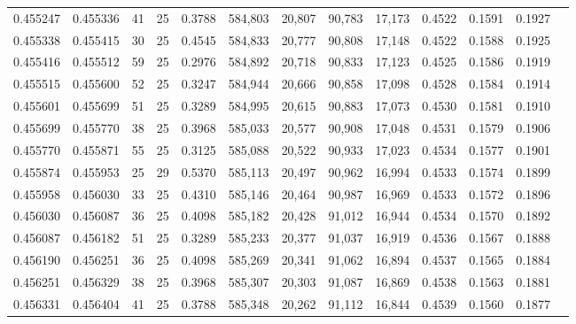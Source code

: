\begin{tabular}{rrrrrrrrrrrrr}
0.455247 & 0.455336 &    41 &  25 &                                     0.3788 & 584,803 &  20,807 &  90,783 &  17,173 & 0.4522 & 0.1591 & 0.1927 \\
0.455338 & 0.455415 &    30 &  25 &                                     0.4545 & 584,833 &  20,777 &  90,808 &  17,148 & 0.4522 & 0.1588 & 0.1925 \\
0.455416 & 0.455512 &    59 &  25 &                                     0.2976 & 584,892 &  20,718 &  90,833 &  17,123 & 0.4525 & 0.1586 & 0.1919 \\
0.455515 & 0.455600 &    52 &  25 &                                     0.3247 & 584,944 &  20,666 &  90,858 &  17,098 & 0.4528 & 0.1584 & 0.1914 \\
0.455601 & 0.455699 &    51 &  25 &                                     0.3289 & 584,995 &  20,615 &  90,883 &  17,073 & 0.4530 & 0.1581 & 0.1910 \\
0.455699 & 0.455770 &    38 &  25 &                                     0.3968 & 585,033 &  20,577 &  90,908 &  17,048 & 0.4531 & 0.1579 & 0.1906 \\
0.455770 & 0.455871 &    55 &  25 &                                     0.3125 & 585,088 &  20,522 &  90,933 &  17,023 & 0.4534 & 0.1577 & 0.1901 \\
0.455874 & 0.455953 &    25 &  29 &                                     0.5370 & 585,113 &  20,497 &  90,962 &  16,994 & 0.4533 & 0.1574 & 0.1899 \\
0.455958 & 0.456030 &    33 &  25 &                                     0.4310 & 585,146 &  20,464 &  90,987 &  16,969 & 0.4533 & 0.1572 & 0.1896 \\
0.456030 & 0.456087 &    36 &  25 &                                     0.4098 & 585,182 &  20,428 &  91,012 &  16,944 & 0.4534 & 0.1570 & 0.1892 \\
0.456087 & 0.456182 &    51 &  25 &                                     0.3289 & 585,233 &  20,377 &  91,037 &  16,919 & 0.4536 & 0.1567 & 0.1888 \\
0.456190 & 0.456251 &    36 &  25 &                                     0.4098 & 585,269 &  20,341 &  91,062 &  16,894 & 0.4537 & 0.1565 & 0.1884 \\
0.456251 & 0.456329 &    38 &  25 &                                     0.3968 & 585,307 &  20,303 &  91,087 &  16,869 & 0.4538 & 0.1563 & 0.1881 \\
0.456331 & 0.456404 &    41 &  25 &                                     0.3788 & 585,348 &  20,262 &  91,112 &  16,844 & 0.4539 & 0.1560 & 0.1877 \\

\end{tabular}
